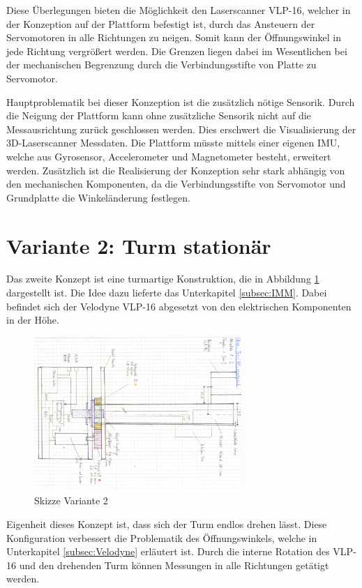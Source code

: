  Diese Überlegungen bieten die Möglichkeit den Laserscanner VLP-16, welcher in der Konzeption auf der Plattform befestigt ist, durch das Ansteuern der Servomotoren in alle Richtungen zu neigen. Somit kann der Öffnungswinkel in jede Richtung vergrößert werden. Die Grenzen liegen dabei im Wesentlichen bei der mechanischen Begrenzung durch die Verbindungsstifte von Platte zu Servomotor.
 
 Hauptproblematik bei dieser Konzeption ist die zusätzlich nötige Sensorik. Durch die Neigung der Plattform kann ohne zusätzliche Sensorik nicht auf die Messausrichtung zurück geschlossen werden. Dies erschwert die Visualisierung der 3D-Laserscanner Messdaten. Die Plattform müsste mittels einer eigenen \ac{IMU}, welche aus Gyrosensor, Accelerometer und Magnetometer besteht, erweitert werden. Zusätzlich ist die Realisierung der Konzeption sehr stark abhängig von den mechanischen Komponenten, da die Verbindungsstifte von Servomotor und Grundplatte die Winkeländerung festlegen.
 

\section {Variante 2: Turm stationär}
\label{sec:var2}
Das zweite Konzept ist eine turmartige Konstruktion, die in Abbildung \ref{fig:skizze_unrotierend} dargestellt ist. Die Idee dazu lieferte das Unterkapitel \ref{subsec:IMM}. Dabei befindet sich der Velodyne VLP-16 abgesetzt von den elektrischen Komponenten in der Höhe.

\begin{figure}[H]
	\centering
	\includegraphics[angle=90,width=0.7\textwidth]{resources/skizze_unrotierend.PNG}
	\caption[Skizze Variante 2]{Skizze Variante 2 }
	\label{fig:skizze_unrotierend}
\end{figure} 

Eigenheit dieses Konzept ist, dass sich der Turm endlos drehen lässt. Diese Konfiguration verbessert die Problematik des Öffnungswinkels, welche in Unterkapitel \ref{subsec:Velodyne} erläutert ist. Durch die interne Rotation des VLP-16 und den drehenden Turm können Messungen in alle Richtungen getätigt werden. 

